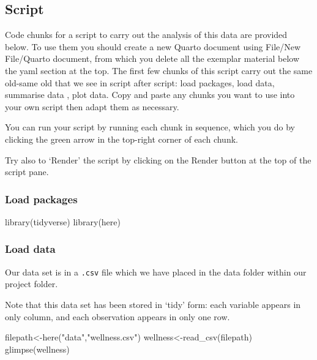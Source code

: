 \documentclass[
  letterpaper,
  DIV=11,
  numbers=noendperiod]{scrreprt}
\newenvironment{Shaded}{\begin{snugshade}}{\end{snugshade}}
\newcommand{\FunctionTok}[1]{\textcolor[rgb]{0.28,0.35,0.67}{#1}}
\newcommand{\NormalTok}[1]{\textcolor[rgb]{0.00,0.23,0.31}{#1}}
\newcommand{\OtherTok}[1]{\textcolor[rgb]{0.00,0.23,0.31}{#1}}
\newcommand{\StringTok}[1]{\textcolor[rgb]{0.13,0.47,0.30}{#1}}
\begin{document}
\subsection{Script}\label{script}

Code chunks for a script to carry out the analysis of this data are
provided below. To use them you should create a new Quarto document
using File/New File/Quarto document, from which you delete all the
exemplar material below the yaml section at the top. The first few
chunks of this script carry out the same old-same old that we see in
script after script: load packages, load data, summarise data , plot
data. Copy and paste any chunks you want to use into your own script
then adapt them as necessary.

You can run your script by running each chunk in sequence, which you do
by clicking the green arrow in the top-right corner of each chunk.

Try also to `Render' the script by clicking on the Render button at the
top of the script pane.

\subsubsection{Load packages}\label{load-packages-2}

\begin{Shaded}
\begin{Highlighting}[]
\FunctionTok{library}\NormalTok{(tidyverse)}
\FunctionTok{library}\NormalTok{(here)}
\end{Highlighting}
\end{Shaded}

\subsubsection{Load data}\label{load-data-1}

Our data set is in a \texttt{.csv} file which we have placed in the data
folder within our project folder.

Note that this data set has been stored in `tidy' form: each variable
appears in only column, and each observation appears in only one row.

\begin{Shaded}
\begin{Highlighting}[]
\NormalTok{filepath}\OtherTok{\textless{}{-}}\FunctionTok{here}\NormalTok{(}\StringTok{"data"}\NormalTok{,}\StringTok{"wellness.csv"}\NormalTok{)}
\NormalTok{wellness}\OtherTok{\textless{}{-}}\FunctionTok{read\_csv}\NormalTok{(filepath)}
\FunctionTok{glimpse}\NormalTok{(wellness)}
\end{Highlighting}
\end{Shaded}
\end{document}
